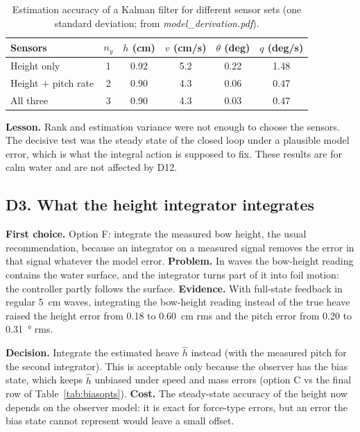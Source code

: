 \documentclass[11pt,a4paper]{article}
\begin{document}
\begin{table}[htbp]
\centering
\caption{Estimation accuracy of a Kalman filter for different sensor sets
(one standard deviation; from \emph{model\_derivation.pdf}).}
\label{tab:sensors}
\begin{tabular}{@{}lccccc@{}}
\toprule
Sensors & $n_y$ & $h$ (cm) & $v$ (cm/s) & $\theta$ (deg) & $q$ (deg/s) \\ \midrule
Height only & 1 & 0.92 & 5.2 & 0.22 & 1.48 \\
Height + pitch rate & 2 & 0.90 & 4.3 & 0.06 & 0.47 \\
All three & 3 & 0.90 & 4.3 & 0.03 & 0.47 \\
\bottomrule
\end{tabular}
\end{table}

\textbf{Lesson.} Rank and estimation variance were not enough to choose the
sensors. The decisive test was the steady state of the closed loop under a
plausible model error, which is what the integral action is supposed to fix.
These results are for calm water and are not affected by D12.

\subsection{D3. What the height integrator integrates}

\textbf{First choice.} Option F: integrate the measured bow height, the usual
recommendation, because an integrator on a measured signal removes the error in
that signal whatever the model error. \textbf{Problem.} In waves the bow-height
reading contains the water surface, and the integrator turns part of it into
foil motion: the controller partly follows the surface. \textbf{Evidence.} With
full-state feedback in regular \SI{5}{cm} waves, integrating the bow-height
reading instead of the true heave raised the height error from 0.18 to
\SI{0.60}{cm} rms and the pitch error from 0.20 to \SI{0.31}{\degree} rms.

\textbf{Decision.} Integrate the estimated heave $\hat h$ instead (with the
measured pitch for the second integrator). This is acceptable only because the
observer has the bias state, which keeps $\hat h$ unbiased under speed and mass
errors (option C vs the final row of Table~\ref{tab:biasopts}).
\textbf{Cost.} The steady-state accuracy of the height now depends on the
observer model: it is exact for force-type errors, but an error the bias state
cannot represent would leave a small offset.
\end{document}
